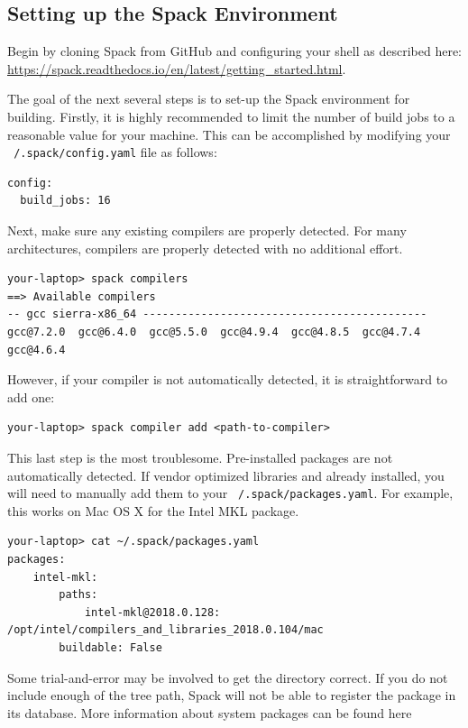 \subsection{Setting up the Spack Environment}
Begin by cloning Spack from GitHub and configuring your shell as described
here:
\url{https://spack.readthedocs.io/en/latest/getting_started.html}.

The goal of the next several steps is to set-up the Spack environment
for building. Firstly, it is highly recommended to limit the number of build jobs to
a reasonable value for your machine. This can be
accomplished by modifying your \texttt{~/.spack/config.yaml} file as follows:
\verbatimfont{\footnotesize}
\begin{verbatim}
config:
  build_jobs: 16
\end{verbatim}

Next, make sure any existing compilers are properly detected. For many
architectures, compilers are properly detected with no additional
effort.
\verbatimfont{\footnotesize}
\begin{verbatim}
your-laptop> spack compilers
==> Available compilers
-- gcc sierra-x86_64 --------------------------------------------
gcc@7.2.0  gcc@6.4.0  gcc@5.5.0  gcc@4.9.4  gcc@4.8.5  gcc@4.7.4  gcc@4.6.4
\end{verbatim}

However, if your compiler is not automatically detected, it is straightforward
to add one:
\verbatimfont{\footnotesize}
\begin{verbatim}
your-laptop> spack compiler add <path-to-compiler>
\end{verbatim}

This last step is the most troublesome. Pre-installed packages are not
automatically detected. If vendor optimized libraries and already installed,
you will need to manually add them to your
\texttt{~/.spack/packages.yaml}. For example, this works on Mac OS X for the Intel MKL package.
\verbatimfont{\footnotesize}
\begin{verbatim}
your-laptop> cat ~/.spack/packages.yaml
packages:
    intel-mkl:
        paths:
            intel-mkl@2018.0.128: /opt/intel/compilers_and_libraries_2018.0.104/mac
        buildable: False
\end{verbatim}

Some trial-and-error may be involved to get the directory correct. If
you do not include enough of the tree path, Spack will not be able to
register the package in its database. More information about system
packages can be found here

